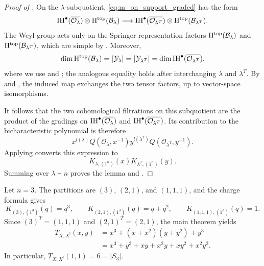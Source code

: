 \begin{proof}[Proof of ]
  On the $\lambda$-subquotient, \eqref{eq:m_on_support_graded} has the
  form
  \[
    \mathrm{IH}^\bullet(\overline{\mathcal O_\lambda})
      \otimes\mathrm{H}^\mathrm{top}(\mathcal{B}_\lambda)
    \longrightarrow
    \mathrm{IH}^\bullet(\overline{\mathcal O_{\lambda^T}})
      \otimes\mathrm{H}^\mathrm{top}(\mathcal{B}_{\lambda^T}).
  \]
  The Weyl group acts only on the Springer-representation factors
  $\mathrm{H}^\mathrm{top}(\mathcal{B}_\lambda)$ and $\mathrm{H}^\mathrm{top}(\mathcal{B}_{\lambda^T})$, which are simple
  by . Moreover,
  \[
    \dim\mathrm{H}^\mathrm{top}(\mathcal{B}_\lambda)
      =|\mathcal Y_\lambda|
      =|\mathcal Y_{\lambda^T}|
      =\dim\mathrm{IH}^\bullet(\overline{\mathcal O_{\lambda^T}}),
  \]
  where we use  and ; the analogous
  equality holds after interchanging $\lambda$ and $\lambda^T$.
  By  and , the induced
  map exchanges the two tensor factors, up to vector-space
  isomorphisms.

  It follows that the two cohomological filtrations on this subquotient
  are the product of the gradings on
  $\mathrm{IH}^\bullet(\overline{\mathcal O_\lambda})$ and
  $\mathrm{IH}^\bullet(\overline{\mathcal O_{\lambda^T}})$. Its contribution
  to the bicharacteristic polynomial is therefore
  \[
    x^{l(\lambda)}Q(\mathcal O_\lambda,x^{-1})
    y^{l(\lambda^T)}Q(\mathcal O_{\lambda^T},y^{-1}).
  \]
  Applying  converts this expression to
  \[
    K_{\lambda,(1^n)}(x)K_{\lambda^T,(1^n)}(y).
  \]
  Summing over $\lambda\vdash n$ proves the lemma and
  .
\end{proof}

\begin{example}{}
  Let $n=3$. The partitions are $(3)$, $(2,1)$, and $(1,1,1)$, and the
  charge formula gives
  \[
    K_{(3),(1^3)}(q)=q^3,
    \qquad
    K_{(2,1),(1^3)}(q)=q+q^2,
    \qquad
    K_{(1,1,1),(1^3)}(q)=1.
  \]
  Since $(3)^T=(1,1,1)$ and $(2,1)^T=(2,1)$, the main theorem yields
  \begin{align*}
    T_{X,X^!}(x,y)
      &=x^3+(x+x^2)(y+y^2)+y^3\\
      &=x^3+y^3+xy+x^2y+xy^2+x^2y^2.
  \end{align*}
  In particular, $T_{X,X^!}(1,1)=6=|S_3|$.
\end{example}
